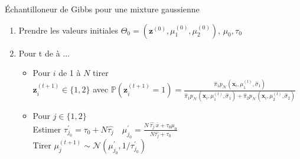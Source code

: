 \begin{frame}
    \small
    \begin{exampleblock}{\'Echantilloneur de Gibbs pour une mixture gaussienne}
    \begin{enumerate}
        \item Prendre les valeurs initiales $\Theta_0 = (\boldsymbol{z}^{(0)}, \mu_{1}^{(0)}, \mu_{2}^{(0)})$, $\mu_0, \tau_0$
        \item Pour t de  à ...
            \begin{itemize}
                \item Pour $i$ de 1 à $N$ tirer \\
                {\addtolength{\leftskip}{2cm} 
                    $\boldsymbol{z}_i^{(t+1)} \in \{1, 2 \}$ avec $\mathbb{P}(\boldsymbol{z}_i^{(t+1)}=1) = 
                    { \displaystyle \frac{
                    \hat{\pi}_{1}  p_{\mathcal{N}}(\boldsymbol{x}_i,\mu_{1}^{(t)}, \hat{\sigma}_{1})
                    }{
                        \hat{\pi}_{1}  p_{\mathcal{N}}(\boldsymbol{x}_i,\mu_{1}^{(t)}, \hat{\sigma}_{1})  +  
                        \hat{\pi}_{2}  p_{\mathcal{N}}(\boldsymbol{x}_i,\mu_{2}^{(t)}, \hat{\sigma}_{2})
                    }}$
                }
                \item Pour $j \in \{ 1,2\} $ \\
                Estimer 
                $\tau^{\prime}_{j_0} = \tau_0 + N \hat{\tau_j} \quad \displaystyle
                \mu_{j_0}^{\prime} = \frac{N\ \hat{\tau_j}\ \bar{x}+\tau_{0} \mu_{0}}{N \hat{\tau_j}+\tau_{0}} 
                $ \\
                Tirer $\mu_{j}^{(t+1)} \sim \mathcal{N}\left(\mu_{j_0}^{\prime}, 1 / \tau^{\prime}_{j_0}\right)$
            \end{itemize}
    \end{enumerate}
   
\end{exampleblock}
\end{frame}

